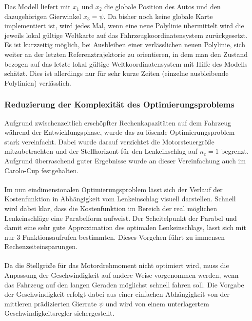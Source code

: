 Das Modell liefert mit $x_1$ und $x_2$ die globale Position des Autos und den dazugehörigen Gierwinkel $x_3=\psi$. Da bisher noch keine globale Karte implementiert ist, wird jedes Mal, wenn eine neue Polylinie übermittelt wird die jeweils lokal gültige Weltkarte auf das Fahrzeugkoordinatensystem zurückgesetzt. Es ist kurzzeitig möglich, bei Ausbleiben einer verlässlichen neuen Polylinie, sich weiter an der letzten Referenztrajektorie zu orientieren, in dem man den Zustand bezogen auf das letzte lokal gültige Weltkoordinatensystem mit Hilfe des Modells schätzt. Dies ist allerdings nur für sehr kurze Zeiten (einzelne ausbleibende Polylinien) verlässlich.
\subsubsection{Reduzierung der Komplexität des Optimierungsproblems}
Aufgrund zwischenzeitlich erschöpfter Rechenkapazitäten auf dem Fahrzeug während der Entwicklungsphase, wurde das zu lösende Optimierungsproblem stark vereinfacht. Dabei wurde darauf verzichtet die Motorsteuergröße mitzubetrachten und der Stellhorizont für den Lenkeinschlag auf $n_c=1$ begrenzt. Aufgrund überraschend guter Ergebnisse wurde an dieser Vereinfachung auch im Carolo-Cup festgehalten.\\ \\
Im nun eindimensionalen Optimierungsproblem lässt sich der Verlauf der Kostenfunktion in Abhängigkeit vom Lenkeinschlag visuell darstellen. Schnell wird dabei klar, dass die Kostenfunktion im Bereich der real möglichen Lenkeinschläge eine Parabelform aufweist. Der Scheitelpunkt der Parabel und damit eine sehr gute Approximation des optimalen Lenkeinschlags, lässt sich mit nur 3 Funktionsaufrufen bestimmten. Dieses Vorgehen führt zu immensen Rechenzeiteinsparungen.\\ \\
Da die Stellgröße für das Motordrehmoment nicht optimiert wird, muss die Anpassung der Geschwindigkeit auf andere Weise vorgenommen werden, wenn das Fahrzeug auf den langen Geraden möglichst schnell fahren soll. Die Vorgabe der Geschwindigkeit erfolgt dabei aus einer einfachen Abhängigkeit von der mittleren prädizierten Gierrate $\dot{\psi}$ und wird von einem unterlagertem Geschwindigkeitsregler sichergestellt.
